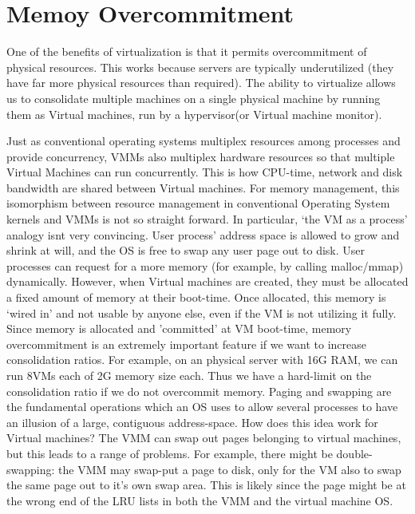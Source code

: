 \documentclass[10pt,a4paper]{article}
\begin{document}
\section{Memoy  Overcommitment}

One of the benefits of virtualization is that it permits overcommitment of physical resources. This works because servers are typically underutilized (they have far more physical resources than required). The ability to virtualize allows us to consolidate multiple machines on a single physical machine by running them as Virtual machines, run by a hypervisor(or Virtual machine monitor).

Just as conventional operating systems multiplex resources among processes and provide concurrency, VMMs also multiplex hardware resources so that multiple Virtual Machines can run concurrently.
This is how CPU-time, network and disk bandwidth are shared between Virtual machines. For memory management, this isomorphism between resource management in conventional Operating System kernels and VMMs is not so straight forward. 
In particular, `the VM as a process'  analogy isnt very convincing. User process' address space is allowed to grow and shrink at will, and the OS is free to swap any user page out to disk. User processes can request for a more memory (for example, by calling malloc/mmap) dynamically. 
However, when Virtual machines are created, they must be allocated a fixed amount of memory at their boot-time. Once allocated, this memory is `wired in' and not usable by anyone else, even if the VM is not utilizing it fully. 
Since memory is allocated and 'committed' at VM boot-time, memory overcommitment is an extremely important feature if we want to increase consolidation ratios. 
For example, on an physical server with 16G RAM, we can run 8VMs each of 2G memory size each. Thus we have a hard-limit on the consolidation ratio if we do not overcommit memory.
Paging and swapping are the fundamental operations which an OS uses to allow several processes to have an illusion of a large, contiguous address-space. How does this idea work for Virtual machines? The VMM can swap out pages belonging to virtual machines, but this leads to  a range of problems. For example, there might be double-swapping: the VMM may swap-put a page to disk, only for the VM also to swap the same page out to it's own swap area. This is likely since the page might be at the wrong end of the LRU lists in both the VMM and the virtual machine OS. 
\end{document}

